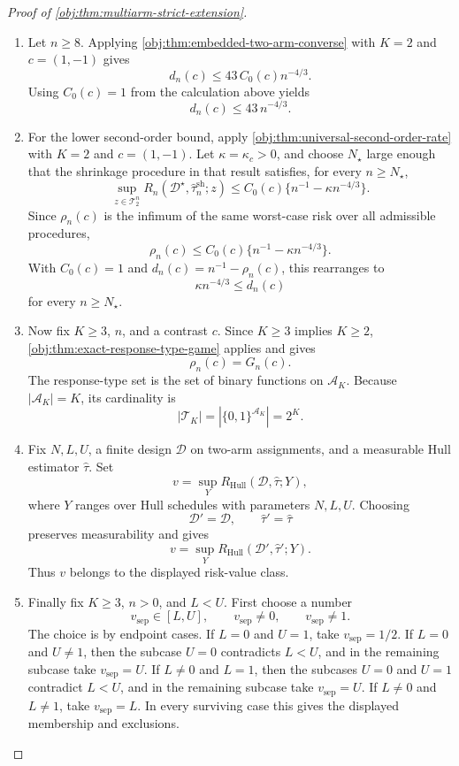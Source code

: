 \documentclass[11pt]{article}
\begin{document}
\begin{proof}[Proof of \cref{obj:thm:multiarm-strict-extension}]
\begin{enumerate}
\item Let \(n\ge 8\). Applying \cref{obj:thm:embedded-two-arm-converse} with \(K=2\) and \(c=(1,-1)\) gives
\[
d_n(c)\le 43\,C_0(c)n^{-4/3}.
\]
Using \(C_0(c)=1\) from the calculation above yields
\[
d_n(c)\le 43\,n^{-4/3}.
\]

\item For the lower second-order bound, apply \cref{obj:thm:universal-second-order-rate} with \(K=2\) and \(c=(1,-1)\). Let \(\kappa=\kappa_c>0\), and choose \(N_\star\) large enough that the shrinkage procedure in that result satisfies, for every \(n\ge N_\star\),
\[
\sup_{z\in\mathcal T_2^n}
R_n(\mathcal D^\star,\widehat\tau_n^{\mathrm{sh}};z)
\le
C_0(c)\{n^{-1}-\kappa n^{-4/3}\}.
\]
Since \(\rho_n(c)\) is the infimum of the same worst-case risk over all admissible procedures,
\[
\rho_n(c)
\le
C_0(c)\{n^{-1}-\kappa n^{-4/3}\}.
\]
With \(C_0(c)=1\) and \(d_n(c)=n^{-1}-\rho_n(c)\), this rearranges to
\[
\kappa n^{-4/3}\le d_n(c)
\]
for every \(n\ge N_\star\). %

\item Now fix \(K\ge3\), \(n\), and a contrast \(c\). Since \(K\ge3\) implies \(K\ge2\), \cref{obj:thm:exact-response-type-game} applies and gives
\[
\rho_n(c)=G_n(c).
\]
The response-type set is the set of binary functions on \(\mathcal A_K\). Because \(|\mathcal A_K|=K\), its cardinality is
\[
|\mathcal T_K|=|\{0,1\}^{\mathcal A_K}|=2^K .
\]

\item Fix \(N,L,U\), a finite design \(\mathcal D\) on two-arm assignments, and a measurable Hull estimator \(\widehat\tau\). Set
\[
v=\sup_Y R_{\mathrm{Hull}}(\mathcal D,\widehat\tau;Y),
\]
where \(Y\) ranges over Hull schedules with parameters \(N,L,U\). Choosing
\[
\mathcal D'=\mathcal D,
\qquad
\widehat\tau'=\widehat\tau
\]
preserves measurability and gives
\[
v=\sup_Y R_{\mathrm{Hull}}(\mathcal D',\widehat\tau';Y).
\]
Thus \(v\) belongs to the displayed risk-value class. %

\item Finally fix \(K\ge3\), \(n>0\), and \(L<U\). First choose a number
\[
v_{\mathrm{sep}}\in [L,U],
\qquad
v_{\mathrm{sep}}\ne 0,
\qquad
v_{\mathrm{sep}}\ne 1 .
\]
The choice is by endpoint cases. If \(L=0\) and \(U=1\), take \(v_{\mathrm{sep}}=1/2\). If \(L=0\) and \(U\ne1\), then the subcase \(U=0\) contradicts \(L<U\), and in the remaining subcase take \(v_{\mathrm{sep}}=U\). If \(L\ne0\) and \(L=1\), then the subcases \(U=0\) and \(U=1\) contradict \(L<U\), and in the remaining subcase take \(v_{\mathrm{sep}}=U\). If \(L\ne0\) and \(L\ne1\), take \(v_{\mathrm{sep}}=L\). In every surviving case this gives the displayed membership and exclusions.


\end{enumerate}
\end{proof}
\end{document}

